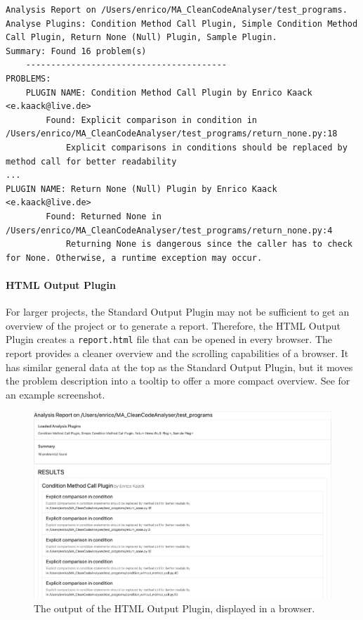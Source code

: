 \begin{lstlisting}[float, floatplacement=h, label=lst:stdout, caption={Example output to \texttt{stdout} of the Standard Output Plugin. Besides a list of problems, it also outputs additional }]
Analysis Report on /Users/enrico/MA_CleanCodeAnalyser/test_programs.
Analyse Plugins: Condition Method Call Plugin, Simple Condition Method Call Plugin, Return None (Null) Plugin, Sample Plugin.
Summary: Found 16 problem(s)
    ----------------------------------------
PROBLEMS:
    PLUGIN NAME: Condition Method Call Plugin by Enrico Kaack <e.kaack@live.de>
        Found: Explicit comparison in condition in /Users/enrico/MA_CleanCodeAnalyser/test_programs/return_none.py:18
            Explicit comparisons in conditions should be replaced by method call for better readability
...
PLUGIN NAME: Return None (Null) Plugin by Enrico Kaack <e.kaack@live.de>
        Found: Returned None in /Users/enrico/MA_CleanCodeAnalyser/test_programs/return_none.py:4
            Returning None is dangerous since the caller has to check for None. Otherwise, a runtime exception may occur.
\end{lstlisting} 

\paragraph{HTML Output Plugin}
For larger projects, the Standard Output Plugin may not be sufficient to get an overview of the project or to generate a report. Therefore, the HTML Output Plugin creates a \texttt{report.html} file that can be opened in every browser. The report provides a cleaner overview and the scrolling capabilities of a browser. It has similar general data at the top as the Standard Output Plugin, but it moves the problem description into a tooltip to offer a more compact overview. See  for an example screenshot.

\begin{figure}
    \includegraphics[width=1\textwidth]{img/CCAP/screenshot_html_output.png}
    \caption{The output of the HTML Output Plugin, displayed in a browser.}
    \label{fig:screen_html_output}
\end{figure}


